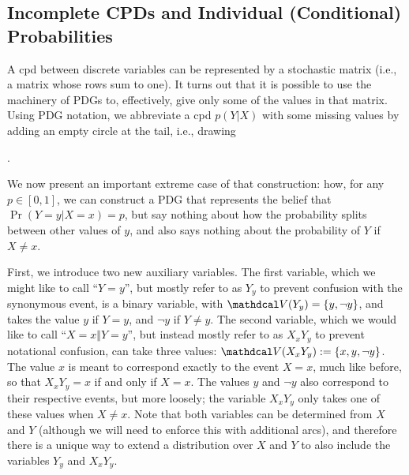 \subsection{Incomplete CPDs and Individual (Conditional) Probabilities}
    \label{sec:prob-widget}
    
A cpd between discrete variables can be represented by
    a stochastic matrix (i.e., a matrix whose rows sum to one).
It turns out that it is possible to use the machinery of PDGs
    to, effectively, give only some of the values in that matrix.
Using PDG notation, we abbreviate a cpd $p(Y|X)$ with some missing values by adding an empty circle at the tail, i.e., drawing 
.    

We now present an important extreme case of that construction:
how, for any $p \in [0,1]$, we can construct a PDG
that represents the belief that $\Pr(Y{=}y|X={x}) = p$, but say nothing about
how the probability splits between other values of $y$, and also says nothing
about the probability of $Y$ if $X \ne x$.


\def\XxYy{{X{=}x\Vert Y{=}y}}
\def\XxYyshort{{X_x Y_y}}
\def\Yy{{Y{=}y}}
\def\Yyshort{{Y_y}}

First, we introduce two new auxiliary variables.
The first variable, which we might like to call ``$\Yy$'', but
    mostly refer to as $\Yyshort$ to prevent confusion with the synonymous
    event, is a binary variable, with $\V(\Yyshort) = \{y, \lnot y\}$,
    and takes the value $y$ if $Y=y$, and $\lnot y$ if $Y \ne y$.
The second variable, which we would like to call ``$\XxYy$'',
    but instead mostly refer to as $\XxYyshort$ to prevent notational confusion,
    can take three values: $\V(\XxYyshort):= \{ x, y, \lnot y \}$.
The value $x$ is meant to correspond exactly to the event $X{=}x$,
    much like before, so that $\XxYyshort = x$ if and only if $X = x$.
The values $y$ and $\lnot y$ also correspond to their respective
    events, but more loosely; the variable $\XxYyshort$ only takes one of these
    values when $X \ne x$.
Note that both variables can be determined from $X$ and $Y$
(although we will need to enforce this with additional arcs), and
therefore there is a unique way to extend a
distribution over $X$ and $Y$ to also include the variables $\Yyshort$ and $\XxYyshort$.

